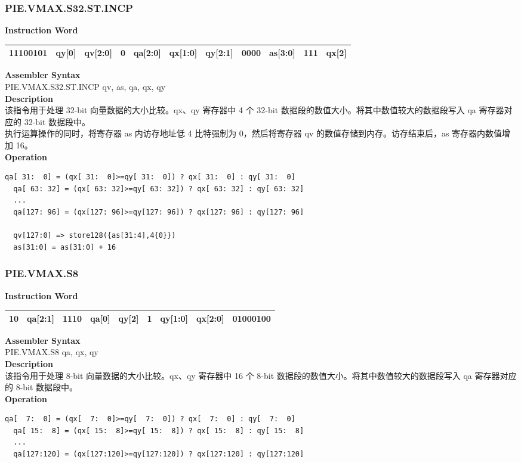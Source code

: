 \newpage
\subsubsection{PIE.VMAX.S32.ST.INCP}\label{instruction:PIEVMAXS32STINCP}
\setlength\tabcolsep{6pt}
\textbf{Instruction Word} \\
\begin{tabular}{|c|c|c|c|c|c|c|c|c|c|c|}
	\hline
	11100101 & qy[0] & qv[2:0] & 0 & qa[2:0] & qx[1:0] & qy[2:1] & 0000 & as[3:0] & 111 & qx[2] \\
	\hline
\end{tabular}

\textbf{Assembler Syntax} \\
PIE.VMAX.S32.ST.INCP qv, as, qa, qx, qy \\
\textbf{Description} \\
该指令用于处理 32-bit 向量数据的大小比较。qx、qy 寄存器中 4 个 32-bit 数据段的数值大小。将其中数值较大的数据段写入 qa 寄存器对应的 32-bit 数据段中。\\
执行运算操作的同时，将寄存器 as 内访存地址低 4 比特强制为 0，然后将寄存器 qv 的数值存储到内存。访存结束后，as 寄存器内数值增加 16。\\
\textbf{Operation}
\begin{lstlisting}[escapeinside=`?]
  qa[ 31:  0] = (qx[ 31:  0]>=qy[ 31:  0]) ? qx[ 31:  0] : qy[ 31:  0]
  qa[ 63: 32] = (qx[ 63: 32]>=qy[ 63: 32]) ? qx[ 63: 32] : qy[ 63: 32]
  ...
  qa[127: 96] = (qx[127: 96]>=qy[127: 96]) ? qx[127: 96] : qy[127: 96]

  qv[127:0] => store128({as[31:4],4{0}})
  as[31:0] = as[31:0] + 16
\end{lstlisting}

\newpage
\subsubsection{PIE.VMAX.S8}\label{instruction:PIEVMAXS8}
\setlength\tabcolsep{6pt}
\textbf{Instruction Word} \\
\begin{tabular}{|c|c|c|c|c|c|c|c|c|}
	\hline
	10 & qa[2:1] & 1110 & qa[0] & qy[2] & 1 & qy[1:0] & qx[2:0] & 01000100 \\
	\hline
\end{tabular}

\textbf{Assembler Syntax} \\
PIE.VMAX.S8 qa, qx, qy \\
\textbf{Description} \\
该指令用于处理 8-bit 向量数据的大小比较。qx、qy 寄存器中 16 个 8-bit 数据段的数值大小。将其中数值较大的数据段写入 qa 寄存器对应的 8-bit 数据段中。\\
\textbf{Operation}
\begin{lstlisting}[escapeinside=`?]
  qa[  7:  0] = (qx[  7:  0]>=qy[  7:  0]) ? qx[  7:  0] : qy[  7:  0]
  qa[ 15:  8] = (qx[ 15:  8]>=qy[ 15:  8]) ? qx[ 15:  8] : qy[ 15:  8]
  ...
  qa[127:120] = (qx[127:120]>=qy[127:120]) ? qx[127:120] : qy[127:120]
\end{lstlisting}

